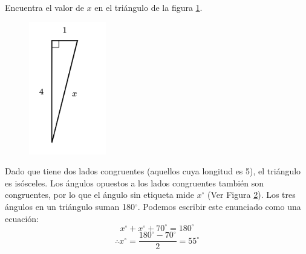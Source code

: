 Encuentra el valor de $x$ en el triángulo de la figura \ref{fig:lados_pitagoras_10}.

\begin{minipage}[t][][t]{0.35\textwidth}
    \begin{figure}[H]
        \centering
        \includegraphics[width=0.3\textwidth]{../images/lados_pitagoras_10.png}

        \caption{}
        \label{fig:lados_pitagoras_10}
    \end{figure}
\end{minipage}\hfill
\begin{minipage}[t][][t]{0.6\textwidth}
    \begin{solutionbox}{8cm}
        \begin{minipage}{0.3\textwidth}
            \begin{figure}[H]
                \centering
                \caption{}
                \label{fig:findangle10a}
            \end{figure}
        \end{minipage}\hfill
        \begin{minipage}{0.65\textwidth}
            Dado que tiene dos lados congruentes (aquellos cuya longitud es 5), el triángulo es isósceles. Los ángulos opuestos a los lados congruentes también son congruentes, por lo que el ángulo sin etiqueta mide $x^\circ$ (Ver Figura \ref{fig:findangle10a}).
            Los tres ángulos en un triángulo suman 180$^\circ$. Podemos escribir este enunciado como una ecuación:
            \[x^\circ + x^\circ + 70^\circ = 180^\circ \]
            \[\therefore x^\circ = \dfrac{180^\circ - 70^\circ}{2}  = 55^\circ\]
        \end{minipage}
    \end{solutionbox}
\end{minipage}
